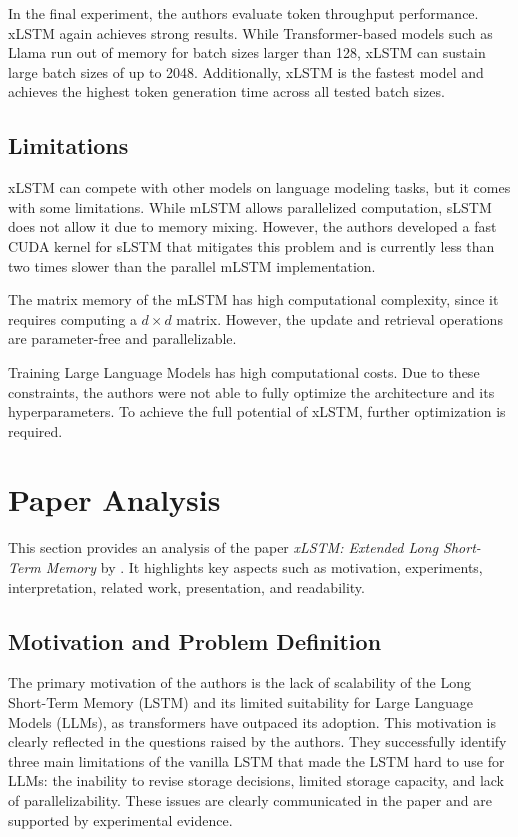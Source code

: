 \documentclass[a4paper,oneside,10pt,ngerman,english]{scrartcl}
\begin{document}
In the final experiment, the authors evaluate token throughput performance. xLSTM again achieves strong results. While Transformer-based models such as Llama run out of memory for batch sizes larger than 128, xLSTM can sustain large batch sizes of up to 2048. Additionally, xLSTM is the fastest model and achieves the highest token generation time across all tested batch sizes.

\subsection{Limitations}
\label{sec:limitations}

xLSTM can compete with other models on language modeling tasks, but it comes with some limitations. While mLSTM allows parallelized computation, sLSTM does not allow it due to memory mixing. However, the authors developed a fast CUDA kernel for sLSTM that mitigates this problem and is currently less than two times slower than the parallel mLSTM implementation.

The matrix memory of the mLSTM has high computational complexity, since it requires computing a $d \times d$ matrix. However, the update and retrieval operations are parameter-free and parallelizable.

Training Large Language Models has high computational costs. Due to these constraints, the authors were not able to fully optimize the architecture and its hyperparameters. To achieve the full potential of xLSTM, further optimization is required.

\section{Paper Analysis}
\label{sec:paperanalysis}

This section provides an analysis of the paper \textit{xLSTM: Extended Long Short-Term Memory} \cite{beck2024xlstmextendedlongshortterm} by \citeauthor{beck2024xlstmextendedlongshortterm}. It highlights key aspects such as motivation, experiments, interpretation, related work, presentation, and readability.

\subsection{Motivation and Problem Definition}
\label{sec:motivation}

The primary motivation of the authors is the lack of scalability of the Long Short-Term Memory (LSTM) and its limited suitability for Large Language Models (LLMs), as transformers have outpaced its adoption. This motivation is clearly reflected in the questions raised by the authors. They successfully identify three main limitations of the vanilla LSTM that made the LSTM hard to use for LLMs: the inability to revise storage decisions, limited storage capacity, and lack of parallelizability. These issues are clearly communicated in the paper and are supported by experimental evidence.
\end{document}
